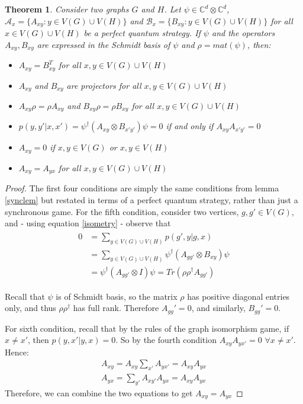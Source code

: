 \documentclass[12pt]{article}
\newtheorem{thm}{Theorem}[section]
\begin{document}
\begin{thm}
  \label{syncthm}
  Consider two graphs $G$ and $H$. Let $\psi \in \mathbb{C}^d \otimes
  \mathbb{C}^d$, $\mathcal{A}_x = \{A_{xy}: y \in V(G) \cup V(H)\}$
  and $\mathcal{B}_x = \{B_{xy}: y \in V(G) \cup V(H)\}$ for all $x
  \in V(G) \cup V(H)$ be a perfect quantum strategy. If $\psi$ and the
  operators $A_{xy}, B_{xy}$ are expressed in the Schmidt basis of
  $\psi$ and $\rho = mat(\psi)$, then:
  \begin{itemize}
  \item $A_{xy} = B_{xy}^T$ for all $x, y \in V(G) \cup V(H)$
  \item $A_{xy}$ and $B_{xy}$ are projectors for all $x, y \in V(G)
    \cup V(H)$
  \item $A_{xy} \rho = \rho A_{xy}$ and $B_{xy} \rho = \rho B_{xy}$
    for all $x, y \in V(G) \cup V(H)$
  \item $p(y, y'|x, x') = \psi^{\dag} (A_{xy} \otimes B_{x'y'}) \psi =
    0$ if and only if $A_{xy}A_{x'y'} = 0$
  \item $A_{xy} = 0$ if $x, y \in V(G)$ or $x, y \in V(H)$
  \item $A_{xy} = A_{yx}$ for all $x, y \in V(G) \cup V(H)$
  \end{itemize}
\end{thm}

\begin{proof}
The first four conditions are simply the same conditions from lemma
\ref{synclem} but restated in terms of a perfect quantum strategy,
rather than just a synchronous game. For the fifth condition, consider
two vertices, $g, g' \in V(G)$, and - using equation \ref{isometry} -
observe that
\begin{align}
\begin{split}
0 &= \sum_{y \in V(G) \cup V(H)} p(g', y|g, x) \\ &= \sum_{y \in V(G)
  \cup V(H)} \psi^{\dag}(A_{gg'} \otimes B_{xy})\psi \\ &=
\psi^{\dag}(A_{gg'} \otimes I)\psi = Tr(\rho \rho^{\dag} A_{gg'})
\end{split}
\end{align}

Recall that $\psi$ is of Schmidt basis, so the matrix $\rho$ has
positive diagonal entries only, and thus $\rho \rho^{\dag}$ has full
rank. Therefore $A_{gg}' = 0$, and similarly, $B_{gg}' = 0$.

For sixth condition, recall that by the rules of the graph isomorphism
game, if $x \neq x'$, then $p(y, x'|y, x) = 0$. So by the fourth
condition $A_{xy}A_{yx'} = 0$ $\forall x \neq x'$. Hence:
\begin{eqnarray}
A_{xy} = A_{xy} \sum_{x'} A_{yx'} = A_{xy}A_{yx} \\ A_{yx} = \sum_{y'}
A_{xy'} A_{yx}= A_{xy}A_{yx}
\end{eqnarray}
Therefore, we can combine the two equations to get $A_{xy} = A_{yx}$
\end{proof}
\end{document}
